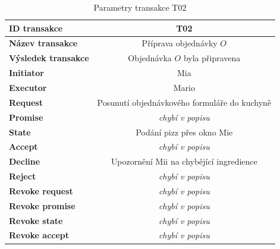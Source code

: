 \documentclass[]{article}
\begin{document}
\begin{table} [H] \centering
\begin{tabular}{|>{\bfseries} l| | c |}
\hline
  ID transakce & T02 \\
\hline
  Název transakce & Příprava objednávky $O$  \\
\hline
  Výsledek transakce & Objednávka $O$ byla připravena \\
\hline
  Initiator & Mia \\
\hline
  Executor & Mario \\
\hline
\hline
  Request & Posunutí objednávkového formuláře do kuchyně \\
\hline
  Promise &  \textit{chybí v popisu} \\
\hline
  State & Podání pizz přes okno Mie \\
\hline
  Accept & \textit{chybí v popisu} \\
\hline
\hline
  Decline &  Upozornění Mii na chybějící ingredience \\
\hline
  Reject & \textit{chybí v popisu} \\
\hline
\hline
  Revoke request & \textit{chybí v popisu} \\
\hline
  Revoke promise & \textit{chybí v popisu} \\
\hline
  Revoke state & \textit{chybí v popisu} \\
\hline
  Revoke accept & \textit{chybí v popisu} \\
\hline
\end{tabular}
\caption{Parametry transakce T02}
\label{tab:t02_param}
\end{table}
\end{document}
